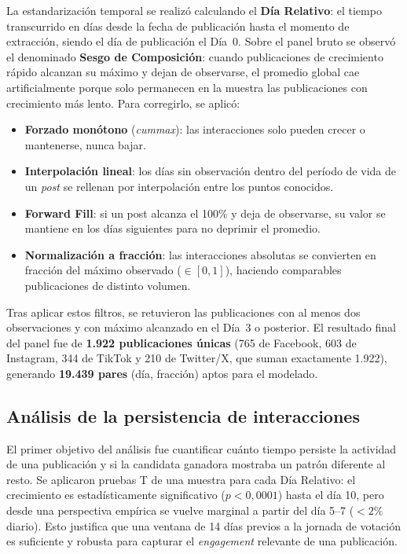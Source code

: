 La estandarización temporal se realizó calculando el \textbf{Día Relativo}: el tiempo transcurrido en días desde la fecha de publicación hasta el momento de extracción, siendo el día de publicación el Día~0. Sobre el panel bruto se observó el denominado \textbf{Sesgo de Composición}: cuando publicaciones de crecimiento rápido alcanzan su máximo y dejan de observarse, el promedio global cae artificialmente porque solo permanecen en la muestra las publicaciones con crecimiento más lento. Para corregirlo, se aplicó:

\begin{itemize}
    \item \textbf{Forzado monótono} (\textit{cummax}): las interacciones solo pueden crecer o mantenerse, nunca bajar.
    \item \textbf{Interpolación lineal}: los días sin observación dentro del período de vida de un \textit{post} se rellenan por interpolación entre los puntos conocidos.
    \item \textbf{Forward Fill}: si un post alcanza el 100\% y deja de observarse, su valor se mantiene en los días siguientes para no deprimir el promedio.
    \item \textbf{Normalización a fracción}: las interacciones absolutas se convierten en fracción del máximo observado ($\in [0,1]$), haciendo comparables publicaciones de distinto volumen.
\end{itemize}

Tras aplicar estos filtros, se retuvieron las publicaciones con al menos dos observaciones y con máximo alcanzado en el Día~3 o posterior. El resultado final del panel fue de \textbf{1.922 publicaciones únicas} (765 de Facebook, 603 de Instagram, 344 de TikTok y 210 de Twitter/X, que suman exactamente 1.922), generando \textbf{19.439 pares} (día, fracción) aptos para el modelado.

\subsection{Análisis de la persistencia de interacciones}

El primer objetivo del análisis fue cuantificar cuánto tiempo persiste la actividad de una publicación y si la candidata ganadora mostraba un patrón diferente al resto. Se aplicaron pruebas T de una muestra para cada Día Relativo: el crecimiento es estadísticamente significativo ($p < 0{,}0001$) hasta el día 10, pero desde una perspectiva empírica se vuelve marginal a partir del día 5–7 ($< 2\%$ diario). Esto justifica que una ventana de 14 días previos a la jornada de votación es suficiente y robusta para capturar el \textit{engagement} relevante de una publicación.

